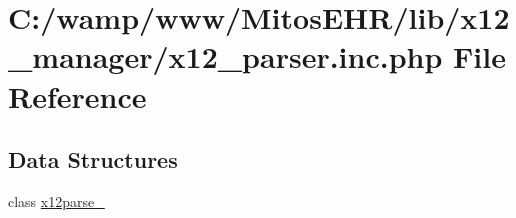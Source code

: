 \hypertarget{x12__parser_8inc_8php}{\section{\-C\-:/wamp/www/\-Mitos\-E\-H\-R/lib/x12\-\_\-manager/x12\-\_\-parser.inc.\-php \-File \-Reference}
\label{x12__parser_8inc_8php}
}
\subsection*{\-Data \-Structures}
\begin{DoxyCompactItemize}
\item 
class \hyperlink{classx12parse__4010}{x12parse\-\_}
\end{DoxyCompactItemize}
